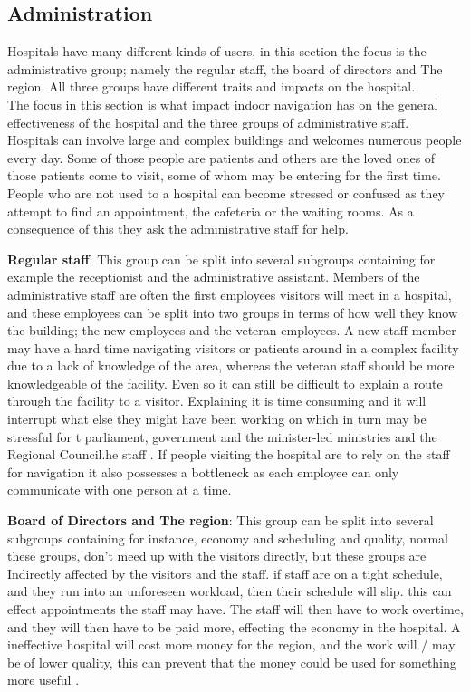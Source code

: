 \subsection{Administration}

Hospitals have many different kinds of users, in this section the focus is the administrative group; namely the regular staff, the board of directors and The region. All three groups have different traits and impacts on the hospital. \\ The focus in this section is what impact indoor navigation has on the general effectiveness of the hospital and the three groups of administrative staff.\\
Hospitals can involve large and complex buildings \cite{wifi_navigation_ca} and welcomes numerous people every day. Some of those people are patients and others are the loved ones of those patients come to visit, some of whom may be entering for the first time. People who are not used to a hospital can become stressed or confused as they attempt to find an appointment, the cafeteria or the waiting rooms. As a consequence of this they ask the administrative staff for help. \cite{Frivillige_guider}

\textbf{Regular staff}: This group can be split into several subgroups containing for example the receptionist and the administrative assistant. Members of the administrative staff are often the first employees visitors will meet in a hospital, and these employees can be split into two groups in terms of how well they know the building; the new employees and the veteran employees. A new staff member may have a hard time navigating visitors or patients around in a complex facility due to a lack of knowledge of the area, whereas the veteran staff should be more knowledgeable of the facility. Even so it can still be difficult to explain a route through the facility to a visitor. Explaining it is time consuming and it will interrupt what else they might have been working on which in turn may be stressful for t parliament, government and the minister-led ministries and the Regional Council.he staff \cite{arbejdsmiljo_ca}. If people visiting the hospital are to rely on the staff for navigation it also possesses a bottleneck as each employee can only communicate with one person at a time.

\textbf{Board of Directors and The region}: This group can be split into several subgroups containing for instance, economy and scheduling and quality, normal these groups, don't meed up with the visitors directly, but these groups are Indirectly affected by the visitors and the staff. if staff are on a tight schedule, and they run into an unforeseen workload, then their schedule will slip. this can effect appointments the staff may have. The staff will then have to work overtime, and they will then have to be paid more, effecting the economy in the hospital. A ineffective hospital will cost more money for the region, and the work will / may be of lower quality, this can prevent that the money could be used for something more useful \cite{timer_til_at_hjelpe_rundt}.

